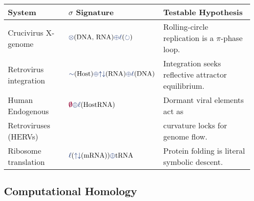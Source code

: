 \begin{center}
\renewcommand{\arraystretch}{1.2}
\begin{tabular}{l l l}
\hline
\textbf{System} & \textbf{$\sigma$ Signature} & \textbf{Testable Hypothesis} \\
\hline
Crucivirus X-genome & $\tensor(\text{DNA, RNA}) \fuse \lha(\rotate)$ & Rolling-circle replication is a $\pi$-phase loop. \\
Retrovirus integration & $\reflec(\text{Host}) \fuse \repflow(\text{RNA}) \fuse \lha(\text{DNA})$ & Integration seeks reflective attractor equilibrium. \\
Human Endogenous & $\void \fuse \lha(\text{HostRNA})$ & Dormant viral elements act as \\
Retroviruses (HERVs) & & curvature locks for genome flow. \\
Ribosome translation & $\lha(\repflow(\text{mRNA})) \fuse \text{tRNA}$ & Protein folding is literal symbolic descent. \\
\hline
\end{tabular}
\end{center}

\subsection{Computational Homology}
